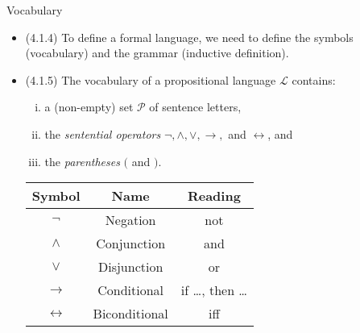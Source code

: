 \begin{frame}{Vocabulary}

	\begin{itemize}
	
		\item (4.1.4) To define a formal language, we need to define the symbols (vocabulary) and the grammar (inductive definition).
		
		\item (4.1.5) The vocabulary of a propositional language $\mathcal{L}$ contains:		
		\begin{enumerate}[(i)]
		
			\item a (non-empty) set $\mathcal{P}$ of sentence letters,
						
			\item the \emph{sentential operators} $\neg,\land,\lor,\to,$ and $\leftrightarrow$, and 
			
			\item the \emph{parentheses} $($ and $)$.
		
		\end{enumerate}

		\begin{center}
			\begin{tabular}{c | c | c}
			Symbol & Name & Reading\\ \hline
			
			$\neg$ & Negation & not\\
			$\land$ & Conjunction & and\\
			$\lor$ & Disjunction & or\\
			$\to$ & Conditional & if \dots, then \dots\\
			$\leftrightarrow$ & Biconditional & iff
			\end{tabular}
		\end{center}	
	\end{itemize}

\end{frame}

